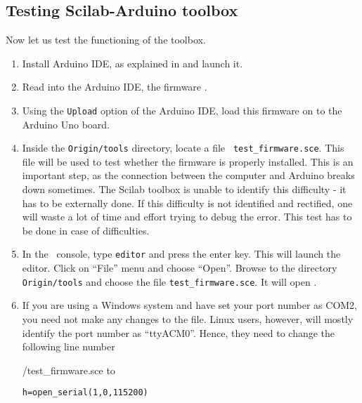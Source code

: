 \subsection{Testing Scilab-Arduino toolbox}
\label{sec:testing-scilab-arduino}
Now let us test the functioning of the toolbox. 
\begin{enumerate}
      \item Install Arduino IDE, as explained in  and
            launch it.
      \item Read into the Arduino IDE, the firmware .
      \item Using the {\tt Upload} option of the Arduino IDE, load this
            firmware on to the Arduino Uno board.
      \item Inside the {\tt Origin/tools} directory, locate a file {\tt
                        test\_firmware.sce}. This file will be used to test whether the
            firmware is properly installed.  This is an important step, as the
            connection between the computer and Arduino breaks down sometimes.
            The Scilab toolbox is unable to identify this difficulty - it has to
            be externally done.  If this difficulty is not identified and
            rectified, one will waste a lot of time and effort trying to debug
            the error.  This test has to be done in case of difficulties.
      \item In the \scilab\ console, type {\tt editor} and press the enter
            key. This will launch the editor. Click on ``File'' menu and choose
            ``Open''. Browse to the directory {\tt Origin/tools} and choose the
            file {\tt test\_firmware.sce}.  It will open
            .  
            
      \item If you are using a Windows system and have set your port number
            as COM2, you need not make any changes to the file. Linux users,
            however, will mostly identify the port number as ``ttyACM0''. Hence, 
            they need to change the following line number
            
            {\LocSWchkcode/test_firmware.sce}
            to
            \begin{lstlisting}[style=nonumbers]
  h=open_serial(1,0,115200)
\end{lstlisting}
            

\end{enumerate}
